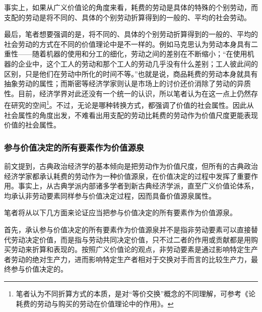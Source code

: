 事实上，如果从广义价值论的角度来看，耗费的劳动是具体的特殊的个别劳动，而支配的劳动是将不同的、具体的个别劳动折算得到的一般的、平均的社会劳动。

最后，笔者想要强调的是，将不同的、具体的个别劳动折算得到的一般的、平均的社会劳动的方式在不同的价值理论中是不一样的。例如马克思认为劳动本身具有二重性——随着机器的使用和分工的细化，劳动之间的差别在不断缩小\cite[96]{ZhongGongZhongYangMaKeSiEnGeSiLieNingSiDaLinZhuZuoBianYiJuMaKeSiEnGeSiQuanJiDi4Juan1958}；“在使用机器的企业中，这个工人的劳动和那个工人的劳动几乎没有什么差别；工人彼此间的区别，只是他们在劳动中所化的时间不等。”\cite[97]{ZhongGongZhongYangMaKeSiEnGeSiLieNingSiDaLinZhuZuoBianYiJuMaKeSiEnGeSiQuanJiDi4Juan1958}也就是说，商品耗费的劳动本身就具有抽象劳动的属性；而斯密等经济学家则认是市场上的讨价还价消除了劳动的异质性。目前，经济学界对此还没有一个统一的认识，所以笔者认为在这一点上仍然存在研究的空间\footnote{笔者认为不同折算方式的本质，是对“等价交换”概念的不同理解，可参考《论耗费的劳动与购买的劳动在价值理论中的作用》\cite[69]{CaiJiMingLunHaoFeiDeLaoDongYuGouMaiDeLaoDongZaiJieZhiLiLunZhongDeZuoYong2022}。}。不过，无论是哪种转换方式，都强调了价值的社会属性。因此从社会属性的角度出发，不难看出用支配的劳动比耗费的劳动作为价值尺度更能表现价值的社会属性。

\subsubsection{参与价值决定的所有要素作为价值源泉}

前文提到，古典政治经济学的基本倾向是把劳动作为价值尺度，但所有的古典政治经济学家都承认耗费的劳动作为一种价值源泉，在价值决定的过程中发挥了重要作用。事实上，从古典学派内部诸多学者到新古典经济学派，直至广义价值论体系，均承认非劳动要素同样参与价值决定过程，因而具备价值源泉属性。

笔者将从以下几方面来论证应当把参与价值决定的所有要素作为价值源泉。

首先，承认参与价值决定的所有要素作为价值源泉并不是指非劳动要素可以直接替代劳动决定价值，而是指与劳动共同决定价值，只不过二者的作用或贡献都是用购买劳动来折算和表现的。按照广义价值论的观点，非劳动要素是通过影响特定生产者劳动的绝对生产力，进而影响特定生产者相对于交换对手而言的比较生产力，最终参与价值决定的。

